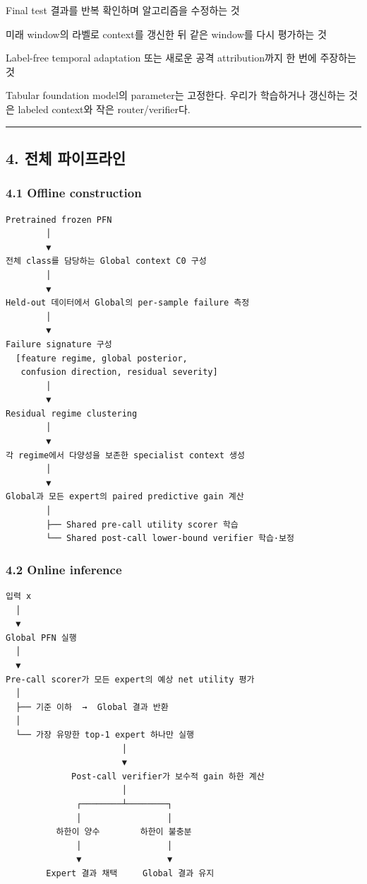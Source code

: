 \par\noindent \textbullet\enspace Final test 결과를 반복 확인하며 알고리즘을 수정하는 것


\par\noindent \textbullet\enspace 미래 window의 라벨로 context를 갱신한 뒤 같은 window를 다시 평가하는 것


\par\noindent \textbullet\enspace Label-free temporal adaptation 또는 새로운 공격 attribution까지 한 번에 주장하는 것


Tabular foundation model의 parameter는 고정한다. 우리가 학습하거나 갱신하는 것은 labeled context와 작은 router/\allowbreak{}verifier다.


\medskip\hrule\medskip
\subsection{4. 전체 파이프라인}
\subsubsection{4.1 Offline construction}

\begin{Verbatim}[breaklines=true,breakanywhere=true,fontsize=\scriptsize]
Pretrained frozen PFN
        │
        ▼
전체 class를 담당하는 Global context C0 구성
        │
        ▼
Held-out 데이터에서 Global의 per-sample failure 측정
        │
        ▼
Failure signature 구성
  [feature regime, global posterior,
   confusion direction, residual severity]
        │
        ▼
Residual regime clustering
        │
        ▼
각 regime에서 다양성을 보존한 specialist context 생성
        │
        ▼
Global과 모든 expert의 paired predictive gain 계산
        │
        ├── Shared pre-call utility scorer 학습
        └── Shared post-call lower-bound verifier 학습·보정

\end{Verbatim}
\subsubsection{4.2 Online inference}

\begin{Verbatim}[breaklines=true,breakanywhere=true,fontsize=\scriptsize]
입력 x
  │
  ▼
Global PFN 실행
  │
  ▼
Pre-call scorer가 모든 expert의 예상 net utility 평가
  │
  ├── 기준 이하  →  Global 결과 반환
  │
  └── 가장 유망한 top-1 expert 하나만 실행
                       │
                       ▼
             Post-call verifier가 보수적 gain 하한 계산
                       │
              ┌────────┴────────┐
              │                 │
          하한이 양수        하한이 불충분
              │                 │
              ▼                 ▼
        Expert 결과 채택     Global 결과 유지

\end{Verbatim}
